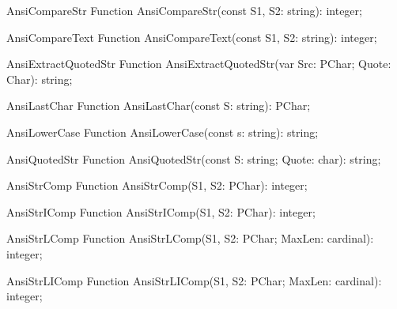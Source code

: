  
\begin{function}{AnsiCompareStr}
\Declaration
Function AnsiCompareStr(const S1, S2: string): integer;
\Description
\Errors
\SeeAlso
\end{function}

 
\begin{function}{AnsiCompareText}
\Declaration
Function AnsiCompareText(const S1, S2: string): integer;
\Description
\Errors
\SeeAlso
\end{function}

 
\begin{function}{AnsiExtractQuotedStr}
\Declaration
Function AnsiExtractQuotedStr(var Src: PChar; Quote: Char): string;
\Description
\Errors
\SeeAlso
\end{function}

 
\begin{function}{AnsiLastChar}
\Declaration
Function AnsiLastChar(const S: string): PChar;
\Description
\Errors
\SeeAlso
\end{function}

 
\begin{function}{AnsiLowerCase}
\Declaration
Function AnsiLowerCase(const s: string): string;
\Description
\Errors
\SeeAlso
\end{function}

 
\begin{function}{AnsiQuotedStr}
\Declaration
Function AnsiQuotedStr(const S: string; Quote: char): string;
\Description
\Errors
\SeeAlso
\end{function}

 
\begin{function}{AnsiStrComp}
\Declaration
Function AnsiStrComp(S1, S2: PChar): integer;
\Description
\Errors
\SeeAlso
\end{function}

 
\begin{function}{AnsiStrIComp}
\Declaration
Function AnsiStrIComp(S1, S2: PChar): integer;
\Description
\Errors
\SeeAlso
\end{function}

 
\begin{function}{AnsiStrLComp}
\Declaration
Function AnsiStrLComp(S1, S2: PChar; MaxLen: cardinal): integer;
\Description
\Errors
\SeeAlso
\end{function}

 
\begin{function}{AnsiStrLIComp}
\Declaration
Function AnsiStrLIComp(S1, S2: PChar; MaxLen: cardinal): integer;
\Description
\Errors
\SeeAlso
\end{function}


